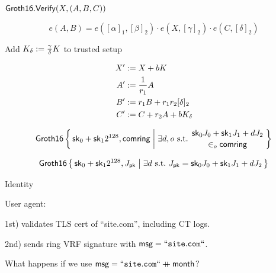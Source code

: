 \documentclass{beamer}
\def\comring{\ensuremath{\mathsf{comring}}\xspace}
\begin{document}
\begin{frame}
	
$\mathsf{Groth16}.{\mathsf{Verify}}(X,(A,B,C))$
	
$$ e(A,B) = e([\alpha]_1, [\beta]_2) \cdot e(X, [\gamma]_2) \cdot e(C, [\delta]_2) $$

\pause\medskip

Add $K_\delta := {\gamma\over\delta} K$ to trusted setup

$$ \begin{aligned}
X' &:= X + b K \\
A' &:= {1 \over r_1} A \\
B' &:= r_1 B + r_1 r_2 [\delta]_2 \\
C' &:= C + r_2 A + b K_\delta \\
\end{aligned} $$

\end{frame}



\begin{frame}

$$ \mathsf{Groth16} \Setst{ \sk_0 + \sk_1 2^{128}, \comring }{
    \exists d,o \textrm{\ s.t.\ }
	\genfrac{}{}{0pt}{}{ \sk_0 J_0 + \sk_1 J_1 + d J_2 }{ \in_o \comring }
} $$

\pause\bigskip 

$$ \mathsf{Groth16} \Setst{ \sk_0 + \sk_1 2^{128}, J_\pk }{ 
	\exists d \textrm{\ s.t.\ }
	J_\pk = \sk_0 J_0 + \sk_1 J_1 + d J_2
} $$

\end{frame}



\begin{frame}{Identity}

User agent: \\ \medskip

1st) validates TLS cert of ``site.com'', including CT logs. \\ \medskip

2nd) sends ring VRF signature with $\mathsf{msg} = \mathtt{``site.com``}$. \\ \medskip

\pause\bigskip\bigskip 

What happens if we use $\mathsf{msg} = \mathtt{``site.com``} \mathbin{+\mkern-10mu+} \mathsf{month}$?

\end{frame}
\end{document}
